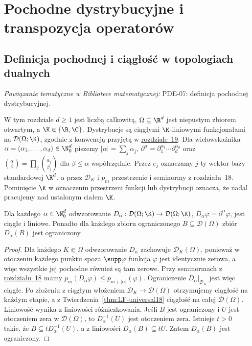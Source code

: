 \setcounter{section}{3}
\section{Pochodne dystrybucyjne i transpozycja operatorów}
\label{sec:pochodne20}

\providecommand{\atlasref}[2]{#2}


\subsection{Definicja pochodnej i ciągłość w topologiach dualnych}

\noindent\emph{Powiązanie tematyczne w Bibliotece matematycznej:} \atlasref{PDE-07::def:pde7-derivative}{PDE-07: definicja pochodnej dystrybucyjnej}.


W tym rozdziale $d\ge1$ jest liczbą całkowitą,
$\Omega\subseteq\R^d$ jest niepustym zbiorem otwartym,
a $\K\in\{\R,\C\}$. Dystrybucje są
ciągłymi $\K$-liniowymi funkcjonałami na $\mathcal D(\Omega;\K)$, zgodnie
z konwencją przyjętą w \hyperref[sec:dystrybucje19]{rozdziale~19}.
Dla wielowskaźnika $\alpha=(\alpha_1,\ldots,\alpha_d)\in\N_0^d$
piszemy $|\alpha|=\sum_j\alpha_j$,
$\partial^\alpha=\partial_1^{\alpha_1}\cdots\partial_d^{\alpha_d}$
oraz $\binom\alpha\beta=\prod_j\binom{\alpha_j}{\beta_j}$
dla $\beta\le\alpha$ współrzędnie. Przez $e_j$ oznaczamy
$j$-ty wektor bazy standardowej $\R^d$, a przez $\mathcal D_K$
i $p_m$ przestrzenie i seminormy z rozdziału~18.
Pominięcie $\K$ w oznaczeniu przestrzeni funkcji lub dystrybucji
oznacza, że nadal pracujemy nad ustalonym ciałem $\K$.

\begin{lemat}
\label{lem:test-derivative20}
Dla każdego $\alpha\in\N_0^d$ odwzorowanie
$D_\alpha:\mathcal D(\Omega;\K)\to\mathcal D(\Omega;\K)$,
$D_\alpha\varphi=\partial^\alpha\varphi$, jest ciągłe i liniowe.
Ponadto dla każdego zbioru ograniczonego $B\subseteq\mathcal D(\Omega)$
zbiór $D_\alpha(B)$ jest ograniczony.
\end{lemat}
\begin{proof}
Dla każdego $K\Subset\Omega$ odwzorowanie $D_\alpha$ zachowuje
$\mathcal D_K(\Omega)$, ponieważ w otoczeniu każdego punktu
spoza $\supp\varphi$ funkcja $\varphi$ jest identycznie zerowa,
a więc wszystkie jej pochodne również są tam zerowe.
Przy seminormach z \hyperref[sec:funkcje-testowe18]{rozdziału~18} mamy
$p_m(D_\alpha\varphi)\le p_{m+|\alpha|}(\varphi)$.
Ograniczenie $D_\alpha|_{\mathcal D_K}$ jest więc ciągłe.
Po złożeniu z ciągłym włożeniem $\mathcal D_K\to\mathcal D(\Omega)$
otrzymujemy ciągłość na każdym etapie, a z
Twierdzenia~\ref{thm:LF-universal18} ciągłość na całej $\mathcal D(\Omega)$.
Liniowość wynika z liniowości różniczkowania.
Jeśli $B$ jest ograniczony i $U$ jest otoczeniem zera
w $\mathcal D(\Omega)$, to $D_\alpha^{-1}(U)$ jest
otoczeniem zera. Istnieje $t>0$ takie, że
$B\subseteq tD_\alpha^{-1}(U)$, a z liniowości
$D_\alpha(B)\subseteq tU$. Zatem $D_\alpha(B)$ jest ograniczony.
\end{proof}


